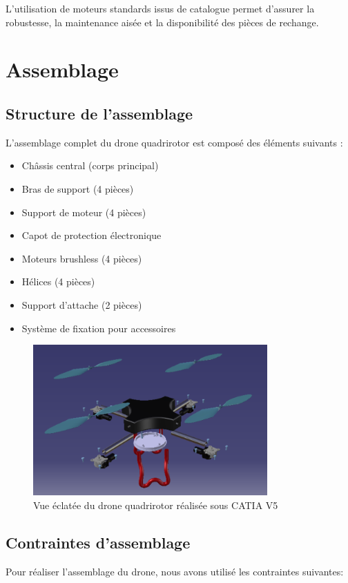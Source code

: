 \documentclass[a4paper,12pt]{report}
\begin{document}
L'utilisation de moteurs standards issus de catalogue permet d'assurer la robustesse, la maintenance aisée et la disponibilité des pièces de rechange.

\chapter{Assemblage}
\section{Structure de l'assemblage}
L'assemblage complet du drone quadrirotor est composé des éléments suivants :
    \begin{itemize}
        \item Châssis central (corps principal)
        \item Bras de support (4 pièces)
    \item Support de moteur (4 pièces)
        \item Capot de protection électronique
        \item Moteurs brushless (4 pièces)
        \item Hélices (4 pièces)
    \item Support d'attache (2 pièces)
        \item Système de fixation pour accessoires
\end{itemize}

\begin{figure}[H]
    \centering
    \includegraphics[width=0.8\textwidth]{images/vue_eclatee_drone.png}
    \caption{Vue éclatée du drone quadrirotor réalisée sous CATIA V5}
    \label{fig:vue_eclatee_drone}
\end{figure}

\section{Contraintes d'assemblage}
Pour réaliser l'assemblage du drone, nous avons utilisé les contraintes suivantes:
\end{document}
